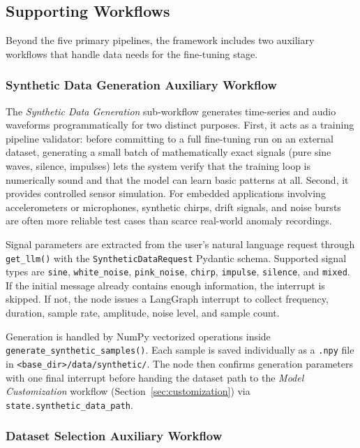 \subsection{Supporting Workflows}
\label{sec:supporting}

Beyond the five primary pipelines, the framework includes two auxiliary workflows that handle data needs for the fine-tuning stage.

\subsubsection{Synthetic Data Generation Auxiliary Workflow}

The \textit{Synthetic Data Generation} sub-workflow generates time-series and audio waveforms programmatically for two distinct purposes. First, it acts as a training pipeline validator: before committing to a full fine-tuning run on an external dataset, generating a small batch of mathematically exact signals (pure sine waves, silence, impulses) lets the system verify that the training loop is numerically sound and that the model can learn basic patterns at all. Second, it provides controlled sensor simulation. For embedded applications involving accelerometers or microphones, synthetic chirps, drift signals, and noise bursts are often more reliable test cases than scarce real-world anomaly recordings.

Signal parameters are extracted from the user's natural language request through \texttt{get\_llm()} with the \texttt{SyntheticDataRequest} Pydantic schema. Supported signal types are \texttt{sine}, \texttt{white\_noise}, \texttt{pink\_noise}, \texttt{chirp}, \texttt{impulse}, \texttt{silence}, and \texttt{mixed}. If the initial message already contains enough information, the interrupt is skipped. If not, the node issues a LangGraph interrupt to collect frequency, duration, sample rate, amplitude, noise level, and sample count.

Generation is handled by NumPy vectorized operations inside \texttt{generate\_\allowbreak synthetic\_\allowbreak samples()}. Each sample is saved individually as a \texttt{.npy} file in \allowbreak\texttt{\textless base\_dir\textgreater/\allowbreak data/\allowbreak synthetic/}. The node then confirms generation parameters with one final interrupt before handing the dataset path to the \textit{Model Customization} workflow (Section~\ref{sec:customization}) via \texttt{state.synthetic\_\allowbreak data\_\allowbreak path}.

\subsubsection{Dataset Selection Auxiliary Workflow}

